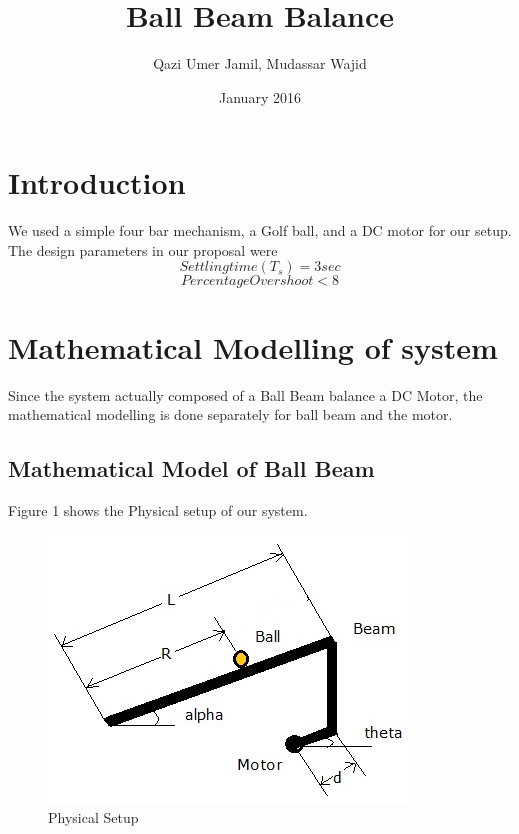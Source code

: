 \documentclass{article}
\title{Ball Beam Balance}
\author{Qazi Umer Jamil, Mudassar Wajid}
\date{January 2016}
\begin{document}
\maketitle

\section{Introduction}
We used a simple four bar mechanism, a Golf ball, and a DC motor for our setup. The design parameters in our proposal were
\[Settling time(T_s) = 3 sec\]
\[Percentage Overshoot < 8\]
\section{Mathematical Modelling of system}
Since the system actually composed of a Ball Beam balance a DC Motor, the mathematical modelling is done separately for ball beam and the motor.
\subsection{Mathematical Model of Ball Beam}
Figure 1 shows the Physical setup of our system.
\begin{figure}[h]
  \includegraphics[width=\linewidth]{model.jpg}
  \caption{Physical Setup}
  \label{fig:boat1}
\end{figure}
\end{document}
